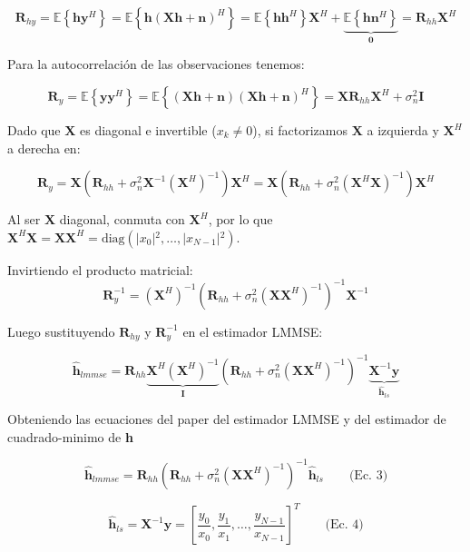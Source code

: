 \documentclass[a4paper]{article}
\begin{document}
$$\mathbf{R}_{hy} = \mathbb{E}\left\{\mathbf{h}\mathbf{y}^H\right\} = \mathbb{E}\left\{\mathbf{h}(\mathbf{X}\mathbf{h} + \mathbf{n})^H\right\} = \mathbb{E}\left\{\mathbf{h}\mathbf{h}^H\right\}\mathbf{X}^H + \underbrace{\mathbb{E}\left\{\mathbf{h}\mathbf{n}^H\right\}}_{\mathbf{0}} = \mathbf{R}_{hh}\mathbf{X}^H$$

Para la autocorrelación de las observaciones tenemos:

$$\mathbf{R}_{y} = \mathbb{E}\left\{\mathbf{y}\mathbf{y}^H\right\} = \mathbb{E}\left\{(\mathbf{X}\mathbf{h} + \mathbf{n})(\mathbf{X}\mathbf{h} + \mathbf{n})^H\right\} = \mathbf{X}\mathbf{R}_{hh}\mathbf{X}^H + \sigma_n^2 \mathbf{I}$$


Dado que $\mathbf{X}$ es diagonal e invertible ($x_k \ne 0$), si factorizamos $\mathbf{X}$ a izquierda y $\mathbf{X}^H$ a derecha en:

$$\mathbf{R}_{y} = \mathbf{X}\left(\mathbf{R}_{hh} + \sigma_n^2 \mathbf{X}^{-1}(\mathbf{X}^H)^{-1}\right)\mathbf{X}^H = \mathbf{X}\left(\mathbf{R}_{hh} + \sigma_n^2 (\mathbf{X}^H\mathbf{X})^{-1}\right)\mathbf{X}^H$$

Al ser $\mathbf{X}$ diagonal, conmuta con $\mathbf{X}^H$, por lo que $\mathbf{X}^H\mathbf{X} = \mathbf{X}\mathbf{X}^H = \text{diag}(\vert{}x_0\vert{}^2, \dots, \vert{}x_{N-1}\vert{}^2)$. 

Invirtiendo el producto matricial:$$\mathbf{R}_{y}^{-1} = (\mathbf{X}^H)^{-1}\left(\mathbf{R}_{hh} + \sigma_n^2 (\mathbf{X}\mathbf{X}^H)^{-1}\right)^{-1}\mathbf{X}^{-1}$$

Luego sustituyendo $\mathbf{R}_{hy}$ y $\mathbf{R}_{y}^{-1}$ en el estimador LMMSE:

$$\hat{\mathbf{h}}_{lmmse} = \mathbf{R}_{hh}\underbrace{\mathbf{X}^H(\mathbf{X}^H)^{-1}}_{\mathbf{I}}\left(\mathbf{R}_{hh} + \sigma_n^2 (\mathbf{X}\mathbf{X}^H)^{-1}\right)^{-1}\underbrace{\mathbf{X}^{-1}\mathbf{y}}_{\hat{\mathbf{h}}_{ls}}$$

Obteniendo las ecuaciones del paper del estimador LMMSE y del estimador de cuadrado-minimo de \textbf{h}

$$\hat{\mathbf{h}}_{lmmse} = \mathbf{R}_{hh}\left(\mathbf{R}_{hh} + \sigma_n^2 (\mathbf{X}\mathbf{X}^H)^{-1}\right)^{-1} \hat{\mathbf{h}}_{ls} \qquad \text{(Ec. 3)}$$

$$\hat{\mathbf{h}}_{ls} = \mathbf{X}^{-1}\mathbf{y} = \left[\frac{y_0}{x_0}, \frac{y_1}{x_1}, \dots, \frac{y_{N-1}}{x_{N-1}}\right]^T \qquad \text{(Ec. 4)}$$
\end{document}
